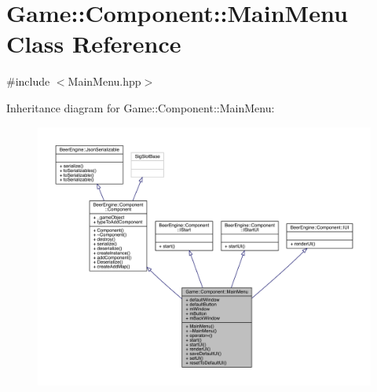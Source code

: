 \hypertarget{class_game_1_1_component_1_1_main_menu}{}\section{Game\+:\+:Component\+:\+:Main\+Menu Class Reference}
\label{class_game_1_1_component_1_1_main_menu}


{\ttfamily \#include $<$Main\+Menu.\+hpp$>$}



Inheritance diagram for Game\+:\+:Component\+:\+:Main\+Menu\+:\nopagebreak
\begin{figure}[H]
\begin{center}
\leavevmode
\includegraphics[width=350pt]{class_game_1_1_component_1_1_main_menu__inherit__graph}
\end{center}
\end{figure}


